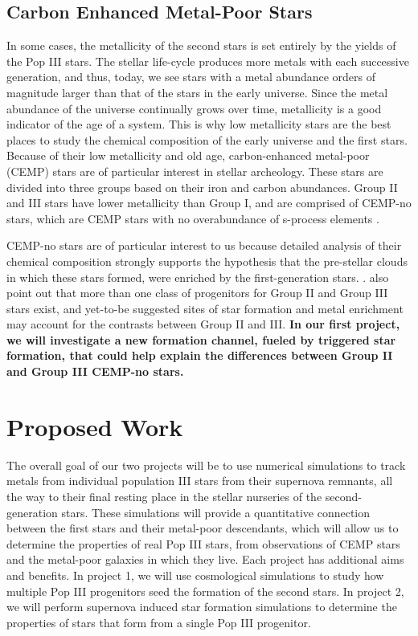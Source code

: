 \documentclass[a4paper, 12pt]{article}
\begin{document}
\subsection{Carbon Enhanced Metal-Poor Stars}

In some cases, the metallicity of the second stars is set entirely by the yields of the Pop III stars. The stellar life-cycle produces more metals with each successive generation, and thus, today, we see stars with a metal abundance orders of magnitude larger than that of the stars in the early universe. Since the metal abundance of the universe continually grows over time, metallicity is a good indicator of the age of a system. This is why low metallicity stars are the best places to study the chemical composition of the early universe and the first stars. Because of their low metallicity and old age, carbon-enhanced metal-poor (CEMP) stars are of particular interest in stellar archeology. These stars are divided into three groups based on their iron and carbon abundances. Group II and III stars have lower metallicity than Group I, and are comprised of CEMP-no stars, which are CEMP stars with no overabundance of s-process elements \citep{Maeder2015}. 

CEMP-no stars are of particular interest to us because detailed analysis of their chemical composition strongly supports the hypothesis that the pre-stellar clouds in which these stars formed, were enriched by the first-generation stars. \citep{Yoon2016}. \cite{Yoon2016} also point out that more than one class of progenitors for Group II and Group III stars exist, and yet-to-be suggested sites of star formation and metal enrichment may account for the contrasts between Group II and III. \textbf{In our first project, we will investigate a new formation channel, fueled by triggered star formation, that could help explain the differences between Group II and Group III CEMP-no stars.}


\section{Proposed Work}
The overall goal of our two projects will be to use numerical simulations to track metals from individual population III stars from their supernova remnants, all the way to their final resting place in the stellar nurseries of the second-generation stars. These simulations will provide a quantitative connection between the first stars and their metal-poor descendants, which will allow us to determine the properties of real Pop III stars, from observations of CEMP stars and the metal-poor galaxies in which they live. Each project has additional aims and benefits. In project 1, we will use cosmological simulations to study how multiple Pop III progenitors seed the formation of the second stars. In project 2, we will perform supernova induced star formation simulations to determine the properties of stars that form from a single Pop III progenitor.
\end{document}
